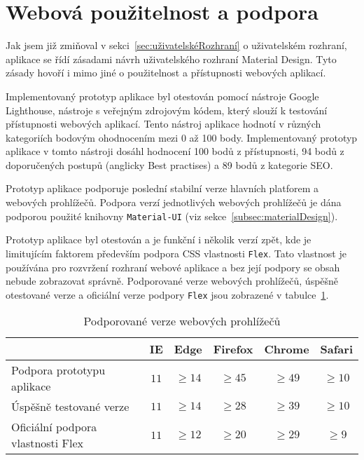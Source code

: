 
\section{Webová použitelnost a podpora}\label{sec:webováPoužitelnostAPodpora}

Jak jsem již zmiňoval v sekci~\ref{sec:uživatelskéRozhraní} o uživatelském rozhraní, aplikace se řídí zásadami návrh uživatelského rozhraní Material Design.
Tyto zásady hovoří i mimo jiné o použitelnost a přístupnosti webových aplikací.

Implementovaný prototyp aplikace byl otestován pomocí nástroje Google Lighthouse, nástroje s veřejným zdrojovým kódem, který slouží k testování přístupnosti webových aplikací.
Tento nástroj aplikace hodnotí v různých kategoriích bodovým ohodnocením mezi 0 až 100 body.
Implementovaný prototyp aplikace v tomto nástroji dosáhl hodnocení 100 bodů z přístupnosti, 94 bodů z doporučených postupů (anglicky Best practises) a 89 bodů z kategorie \gls{SEO}.

Prototyp aplikace podporuje poslední stabilní verze hlavních platforem a webových prohlížečů.
Podpora verzí jednotlivých webových prohlížečů je dána podporou použité knihovny \texttt{Material-UI} (viz sekce~\ref{subsec:materialDesign}).

Prototyp aplikace byl otestován a je funkční i několik verzí zpět, kde je limitujícím faktorem především podpora \acrshort{CSS} vlastnosti \texttt{Flex}.
Tato vlastnost je používána pro rozvržení rozhraní webové aplikace a bez její podpory se obsah nebude zobrazovat správně.
Podporované verze webových prohlížečů, úspěšně otestované verze a oficiální verze podpory \texttt{Flex} jsou zobrazené v tabulce~\ref{tab:verzeProhlížečů}.

\begin{table}[ht!]
    \centering
    \caption{Podporované verze webových prohlížečů}
    \label{tab:verzeProhlížečů}
    \begin{tabular}{l|ccccc}
        & IE & Edge & Firefox & Chrome & Safari \\ \hline
        Podpora prototypu aplikace & $11$ & $\geq 14$ & $\geq 45$ & $\geq 49$ & $\geq 10$ \\
        Úspěšně testované verze & $11$ & $\geq 14$ & $\geq 28$ & $\geq 39$ & $\geq 10$ \\
        Oficiální podpora vlastnosti Flex & $11$ & $\geq 12$ & $\geq 20$ & $\geq 29$ & $\geq 9$
    \end{tabular}
\end{table}
